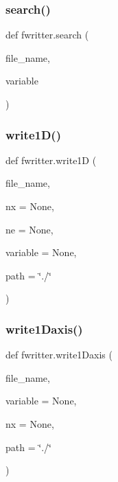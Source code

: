 \mbox{\label{namespacefwritter_a7af214088321c3e10e574e540d09f177}} 
\subsubsection{\texorpdfstring{search()}{search()}}
{\footnotesize\ttfamily def fwritter.\+search (\begin{DoxyParamCaption}\item[{}]{file\+\_\+name,  }\item[{}]{variable }\end{DoxyParamCaption})}

\mbox{\label{namespacefwritter_aeea41eb9752e0ba83695008dd14c26a9}} 
\subsubsection{\texorpdfstring{write1\+D()}{write1D()}}
{\footnotesize\ttfamily def fwritter.\+write1D (\begin{DoxyParamCaption}\item[{}]{file\+\_\+name,  }\item[{}]{nx = {\ttfamily None},  }\item[{}]{ne = {\ttfamily None},  }\item[{}]{variable = {\ttfamily None},  }\item[{}]{path = {\ttfamily \char`\"{}./\char`\"{}} }\end{DoxyParamCaption})}

\mbox{\label{namespacefwritter_a2572282bba36704cc2f52aab12d97caa}} 
\subsubsection{\texorpdfstring{write1\+Daxis()}{write1Daxis()}}
{\footnotesize\ttfamily def fwritter.\+write1\+Daxis (\begin{DoxyParamCaption}\item[{}]{file\+\_\+name,  }\item[{}]{variable = {\ttfamily None},  }\item[{}]{nx = {\ttfamily None},  }\item[{}]{path = {\ttfamily \char`\"{}./\char`\"{}} }\end{DoxyParamCaption})}


